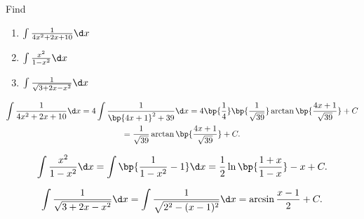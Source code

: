 \begin{problem}
    Find
    \begin{enumerate}
        \item $\int \frac1{4x^2 + 2x + 10} \d x$
        \item $\int \frac{x^2}{1 - x^2} \d x$
        \item $\int \frac1{\sqrt{3 + 2x - x^2}} \d x$
    \end{enumerate}
\end{problem}
\begin{solution}
    \begin{ppart}
        \begin{gather*}
            \int \frac1{4x^2 + 2x + 10} \d x = 4 \int \frac1{\bp{4x + 1}^2 + 39} \d x = 4 \bp{\frac14} \bp{\frac1{\sqrt{39}}} \arctan \bp{\frac{4x+1}{\sqrt{39}}} + C\\
            = \frac1{\sqrt{39}} \arctan \bp{\frac{4x+1}{\sqrt{39}}} + C.
        \end{gather*}
    \end{ppart}
    \begin{ppart}
        \[\int \frac{x^2}{1 - x^2} \d x = \int \bp{\frac1{1 - x^2} - 1} \d x = \frac1{2}\ln\bp{\frac{1 + x}{1 - x}} - x + C.\]
    \end{ppart}
    \begin{ppart}
        \[\int \frac1{\sqrt{3 + 2x - x^2}} \d x = \int \frac1{\sqrt{2^2 - (x-1)^2}} \d x = \arcsin{\frac{x-1}{2}} + C.\]
    \end{ppart}
\end{solution}


